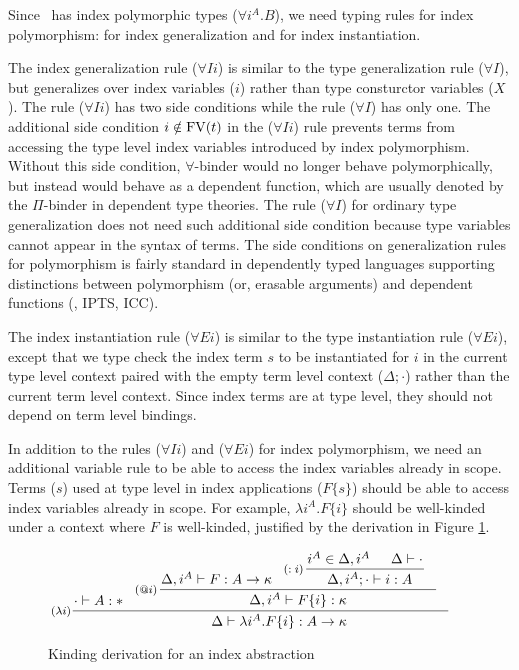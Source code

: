Since \Fi\ has index polymorphic types ($\forall i^A . B$),
we need typing rules for index polymorphism:
 for index generalization
and  for index instantiation.

The index generalization rule ($\forall I i$) is similar to
the type generalization rule ($\forall I$), but generalizes over
index variables ($i$) rather than type consturctor variables ($X$).
The rule ($\forall I i$) has two side conditions
while the rule ($\forall I$) has only one.
The additional side condition $i\notin\mathop{\mathrm{FV}}(t)$ in the ($\forall I i$) rule
prevents terms from accessing the type level index variables introduced by
index polymorphism. Without this side condition, $\forall$-binder
would no longer behave polymorphically, but instead would behave as
a dependent function, which are usually denoted by the $\Pi$-binder in
dependent type theories. The rule ($\forall I$) for ordinary
type generalization does not need such additional side condition
because type variables cannot appear in the syntax of terms.
The side conditions on generalization rules for polymorphism is fairly standard
in dependently typed languages supporting distinctions between polymorphism
(or, erasable arguments) and dependent functions (\eg, IPTS\cite{LingerS08},
ICC\cite{Miquel01}).

The index instantiation rule ($\forall E i$) is similar to
the type instantiation rule ($\forall E i$), except that
we type check the index term $s$ to be instantiated for $i$
in the current type level context paired with the empty term level context
($\Delta;\cdot$) rather than the current term level context.
Since index terms are at type level, they should not depend on
term level bindings.

In addition to the rules ($\forall I i$) and ($\forall E i$) for
index polymorphism, we need an additional variable rule 
to be able to access the index variables already in scope. Terms ($s$) used
at type level in index applications ($F\{s\}$) should be able to access
index variables already in scope. For example, $\lambda i^A.F\{i\}$ should be
well-kinded under a context where $F$ is well-kinded,
justified by the derivation in Figure \ref{fig:ivarexample}.

\begin{figure}
\[ \!\!\!\!\!\!\!\!\inference[($\lambda i$)]
      { \!\!\!\! \cdot |- A:* \!\!\!\!&
	\inference[($@i$)\!\!\!]{ \!\!\!\!\Delta, i^A |- F : A -> \kappa
                          & \!\!\!\!\inference[($:i$)\!\!\!]{\!\!\!\! i^A\in \Delta,i^A
                                              & \Delta |- \cdot \!\!\!\!}
                                              {\Delta,i^A;\cdot |- i:A\!\!\!\!}
                          }
                          {\Delta, i^A |- F\{i\} : \kappa} }
      {\Delta |- \lambda i^A.F\{i\} :A -> \kappa\!\!\!\!\!\!\!\!\!\!\!\!\!\!\!\!}
\]
\caption{Kinding derivation for an index abstraction}
\label{fig:ivarexample}
\end{figure}

